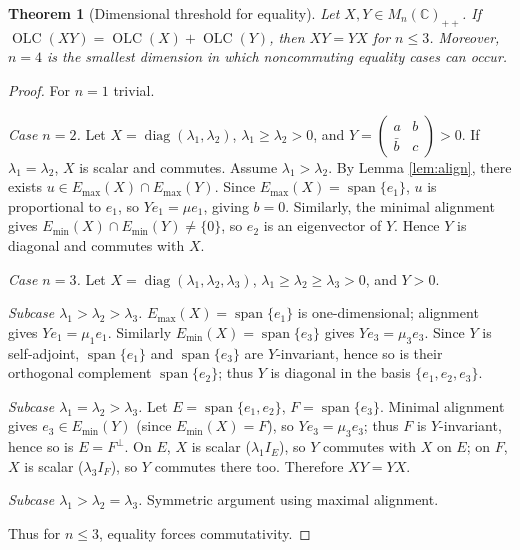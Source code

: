 \documentclass{article}
\newtheorem{theorem}{Theorem}[section]
\theoremstyle{remark}
\providecommand{\QLC}{\operatorname{OLC}}
\providecommand{\Emax}{E_{\max}}
\providecommand{\Emin}{E_{\min}}
\begin{document}
\begin{theorem}[Dimensional threshold for equality]\label{thm:threshold}
Let $X,Y\in M_n(\mathbb{C})_{++}$. If $\QLC(XY)=\QLC(X)+\QLC(Y)$, then $XY=YX$ for $n\le3$. Moreover, $n=4$ is the smallest dimension in which noncommuting equality cases can occur.
\end{theorem}
\begin{proof}
For $n=1$ trivial.

\emph{Case $n=2$.} Let $X=\operatorname{diag}(\lambda_1,\lambda_2)$, $\lambda_1\ge\lambda_2>0$, and $Y=\begin{pmatrix}a&b\\\bar b&c\end{pmatrix}>0$. If $\lambda_1=\lambda_2$, $X$ is scalar and commutes. Assume $\lambda_1>\lambda_2$. By Lemma \ref{lem:align}, there exists $u\in\Emax(X)\cap\Emax(Y)$. Since $\Emax(X)=\operatorname{span}\{e_1\}$, $u$ is proportional to $e_1$, so $Ye_1=\mu e_1$, giving $b=0$. Similarly, the minimal alignment gives $\Emin(X)\cap\Emin(Y)\neq\{0\}$, so $e_2$ is an eigenvector of $Y$. Hence $Y$ is diagonal and commutes with $X$.

\emph{Case $n=3$.} Let $X=\operatorname{diag}(\lambda_1,\lambda_2,\lambda_3)$, $\lambda_1\ge\lambda_2\ge\lambda_3>0$, and $Y>0$.

\emph{Subcase $\lambda_1>\lambda_2>\lambda_3$.} $\Emax(X)=\operatorname{span}\{e_1\}$ is one-dimensional; alignment gives $Ye_1=\mu_1e_1$. Similarly $\Emin(X)=\operatorname{span}\{e_3\}$ gives $Ye_3=\mu_3e_3$. Since $Y$ is self-adjoint, $\operatorname{span}\{e_1\}$ and $\operatorname{span}\{e_3\}$ are $Y$-invariant, hence so is their orthogonal complement $\operatorname{span}\{e_2\}$; thus $Y$ is diagonal in the basis $\{e_1,e_2,e_3\}$.

\emph{Subcase $\lambda_1=\lambda_2>\lambda_3$.} Let $E=\operatorname{span}\{e_1,e_2\}$, $F=\operatorname{span}\{e_3\}$. Minimal alignment gives $e_3\in\Emin(Y)$ (since $\Emin(X)=F$), so $Ye_3=\mu_3e_3$; thus $F$ is $Y$-invariant, hence so is $E=F^\perp$. On $E$, $X$ is scalar ($\lambda_1I_E$), so $Y$ commutes with $X$ on $E$; on $F$, $X$ is scalar ($\lambda_3I_F$), so $Y$ commutes there too. Therefore $XY=YX$.

\emph{Subcase $\lambda_1>\lambda_2=\lambda_3$.} Symmetric argument using maximal alignment.

Thus for $n\le3$, equality forces commutativity.


\end{proof}
\end{document}
